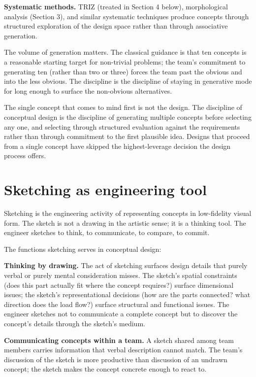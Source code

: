 \textbf{Systematic methods.} TRIZ (treated in Section 4 below), morphological analysis (Section 3), and similar systematic techniques produce concepts through structured exploration of the design space rather than through associative generation.

The volume of generation matters. The classical guidance is that ten concepts is a reasonable starting target for non-trivial problems; the team's commitment to generating ten (rather than two or three) forces the team past the obvious and into the less obvious. The discipline is the discipline of staying in generative mode for long enough to surface the non-obvious alternatives.

\begin{principle}
The single concept that comes to mind first is not the design. The discipline of conceptual design is the discipline of generating multiple concepts before selecting any one, and selecting through structured evaluation against the requirements rather than through commitment to the first plausible idea. Designs that proceed from a single concept have skipped the highest-leverage decision the design process offers.
\end{principle}

\section{Sketching as engineering tool}

Sketching is the engineering activity of representing concepts in low-fidelity visual form. The sketch is not a drawing in the artistic sense; it is a thinking tool. The engineer sketches to think, to communicate, to compare, to commit.

The functions sketching serves in conceptual design:

\textbf{Thinking by drawing.} The act of sketching surfaces design details that purely verbal or purely mental consideration misses. The sketch's spatial constraints (does this part actually fit where the concept requires?) surface dimensional issues; the sketch's representational decisions (how are the parts connected? what direction does the load flow?) surface structural and functional issues. The engineer sketches not to communicate a complete concept but to discover the concept's details through the sketch's medium.

\textbf{Communicating concepts within a team.} A sketch shared among team members carries information that verbal description cannot match. The team's discussion of the sketch is more productive than discussion of an undrawn concept; the sketch makes the concept concrete enough to react to.

